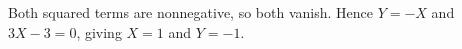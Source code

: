 Both squared terms are nonnegative, so both vanish. Hence $Y=-X$ and $3X-3=0$, giving $X=1$ and $\boxed{Y=-1}$.
